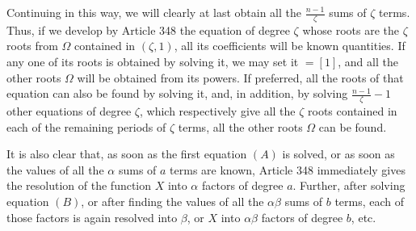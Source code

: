 Continuing in this way, we will clearly at last obtain all the \(\frac{n-1}{\zeta}\) sums of \(\zeta\) terms. Thus, if we develop by Article 348 the equation of degree \(\zeta\) whose roots are the \(\zeta\) roots from \(\Omega\) contained in \((\zeta,1)\), all its coefficients will be known quantities. If any one of its roots is obtained by solving it, we may set it \(=[1]\), and all the other roots \(\Omega\) will be obtained from its powers.
If preferred, all the roots of that equation can also be found by solving it, and, in addition, by solving \(\frac{n-1}{\zeta}-1\) other equations of degree \(\zeta\), which respectively give all the \(\zeta\) roots contained in each of the remaining periods of \(\zeta\) terms, all the other roots \(\Omega\) can be found.

It is also clear that, as soon as the first equation \((A)\) is solved, or as soon as the values of all the \(\alpha\) sums of \(a\) terms are known, Article 348 immediately gives the resolution of the function \(X\) into \(\alpha\) factors of degree \(a\). Further, after solving equation \((B)\), or after finding the values of all the \(\alpha\beta\) sums of \(b\) terms, each of those factors is again resolved into \(\beta\), or \(X\) into \(\alpha\beta\) factors of degree \(b\), etc.


